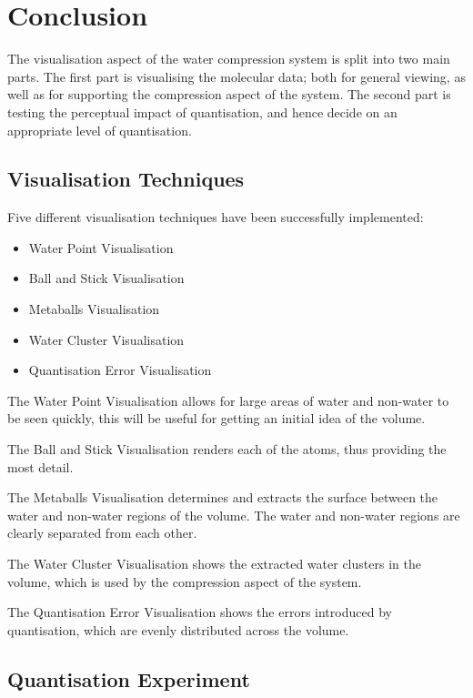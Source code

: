 \chapter{Conclusion}
\label{cha:conclusion}

The visualisation aspect of the water compression system is split into two main
parts. The first part is visualising the molecular data; both for general
viewing, as well as for supporting the compression aspect of the system. The
second part is testing the perceptual impact of quantisation, and hence decide
on an appropriate level of quantisation.

\section{Visualisation Techniques}
\label{sec:conclusion_visualisation}

Five different visualisation techniques have been successfully implemented:
\begin{itemize}
  \item Water Point Visualisation
  \item Ball and Stick Visualisation
  \item Metaballs Visualisation
  \item Water Cluster Visualisation
  \item Quantisation Error Visualisation
\end{itemize}

The Water Point Visualisation allows for large areas of water and non-water to
be seen quickly, this will be useful for getting an initial idea of the volume.

The Ball and Stick Visualisation renders each of the atoms, thus providing the
most detail.

The Metaballs Visualisation determines and extracts the surface between the
water and non-water regions of the volume. The water and non-water regions are
clearly separated from each other.

The Water Cluster Visualisation shows the extracted water clusters in the
volume, which is used by the compression aspect of the system.

The Quantisation Error Visualisation shows the errors introduced by
quantisation, which are evenly distributed across the volume.


\section{Quantisation Experiment}
\label{sec:conclustion_experiment}

